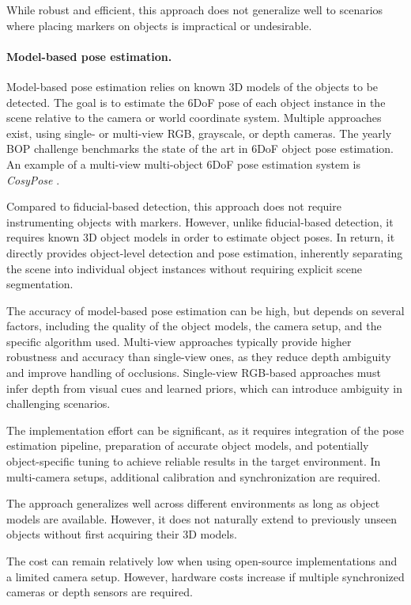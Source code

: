 While robust and efficient, this approach does not generalize well to scenarios where placing markers on objects is impractical or undesirable.


\paragraph{Model-based pose estimation.}
Model-based pose estimation relies on known 3D models of the objects to be detected. The goal is to estimate the 6DoF pose of each object instance in the scene relative to the camera or world coordinate system. Multiple approaches exist, using single- or multi-view RGB, grayscale, or depth cameras. The yearly BOP challenge \cite{BopChallenge} benchmarks the state of the art in 6DoF object pose estimation. An example of a multi-view multi-object 6DoF pose estimation system is \emph{CosyPose} \cite{labbe2020,CosyPoseWebsite}.

Compared to fiducial-based detection, this approach does not require instrumenting objects with markers. However, unlike fiducial-based detection, it requires known 3D object models in order to estimate object poses. In return, it directly provides object-level detection and pose estimation, inherently separating the scene into individual object instances without requiring explicit scene segmentation.

The accuracy of model-based pose estimation can be high, but depends on several factors, including the quality of the object models, the camera setup, and the specific algorithm used. Multi-view approaches typically provide higher robustness and accuracy than single-view ones, as they reduce depth ambiguity and improve handling of occlusions. Single-view RGB-based approaches must infer depth from visual cues and learned priors, which can introduce ambiguity in challenging scenarios.

The implementation effort can be significant, as it requires integration of the pose estimation pipeline, preparation of accurate object models, and potentially object-specific tuning to achieve reliable results in the target environment. In multi-camera setups, additional calibration and synchronization are required.

The approach generalizes well across different environments as long as object models are available. However, it does not naturally extend to previously unseen objects without first acquiring their 3D models.

The cost can remain relatively low when using open-source implementations and a limited camera setup. However, hardware costs increase if multiple synchronized cameras or depth sensors are required.

